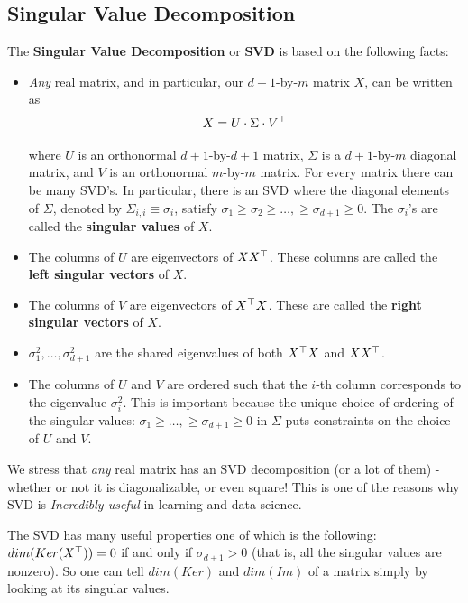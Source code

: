 \subsection{Singular Value Decomposition}

The \textbf{Singular Value Decomposition} or \textbf{SVD} is based on the following facts:

\begin{itemize}
  \item \textit{Any} real matrix, and in particular, our $d+1$-by-$m$ matrix $X$, can be written as
    \[
  X=U\cdot \Sigma \cdot V^{\top}
    \]

where $U$ is an orthonormal $d+1$-by-$d+1$ matrix, $\Sigma$ is a $d+1$-by-$m$ diagonal matrix, and $V$ is an orthonormal $m$-by-$m$ matrix.
For every matrix there can be many SVD's. In particular, there is an SVD where the diagonal elements of $\Sigma$,  denoted by $\Sigma_{i,i}\equiv \sigma_i$, satisfy  $\sigma_1\geq \sigma_2\geq \ldots,\geq \sigma_{d+1}\geq 0$. The $\sigma_i$'s are called the \textbf{singular values} of $X$.

  \item The columns of $U$ are eigenvectors of $XX^{\top}$. These columns are called the \textbf{left singular vectors} of $X$.
  \item The columns of $V$ are eigenvectors of $X^{\top} X$. These are called the \textbf{right singular vectors} of $X$.
  \item $\sigma_1^2,\ldots,\sigma_{d+1}^2$ are the shared eigenvalues of both $X^{\top} X$ and $XX^{\top}$.
  \item The columns of $U$ and $V$ are ordered such that the $i$-th column corresponds to the eigenvalue $\sigma_i^2$.
  This is important because the unique choice of ordering of the singular values: $\sigma_1\geq \ldots,\geq \sigma_{d+1}\geq 0$  in $\Sigma$ puts constraints on the choice of $U$ and $V$.

\end{itemize}

We stress that \textit{any} real matrix has an SVD decomposition (or a lot of them) - whether or not it is diagonalizable, or even square! This is one of the reasons why SVD is \textit{Incredibly useful} in learning and data science.

The SVD has many useful properties one of which is the following: $dim(Ker(X^{\top}))=0$ if and only if $\sigma_{d+1}>0$ (that is, all the singular values are nonzero).
So one can tell $dim(Ker)$ and $dim(Im)$ of a matrix simply by looking at its singular values.


